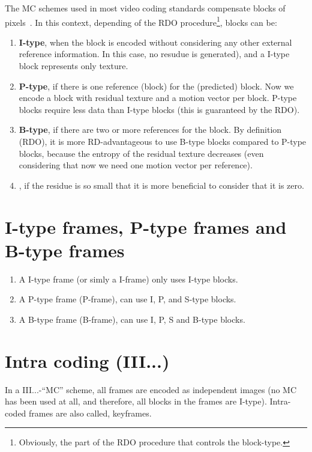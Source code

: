 The MC schemes used in most video coding standards compensate blocks
of pixels~\cite{vruiz__BBMC}. In this context, depending of the RDO
procedure\footnote{Obviously, the part of the RDO procedure that
  controls the block-type.}, blocks can be:
\begin{enumerate}
\item \textbf{I-type}, when the block is encoded without considering
  any other external reference information. In this case, no resudue
  is generated), and a I-type block represents only texture.
\item \textbf{P-type}, if there is one reference (block) for the
  (predicted) block. Now we encode a block with residual texture and a
  motion vector per block. P-type blocks require less data than I-type
  blocks (this is guaranteed by the RDO).
\item \textbf{B-type}, if there are two or more references for the
  block. By definition (RDO), it is more RD-advantageous to use B-type
  blocks compared to P-type blocks, because the entropy of the residual
  texture decreases (even considering that now we need one motion
  vector per reference).
\item {}, if the residue is so small that it is more
  beneficial to consider that it is zero.
\end{enumerate}

\section{I-type frames, P-type frames and B-type frames}

\begin{enumerate}
\item A I-type frame (or simly a I-frame) only uses I-type blocks.
\item A P-type frame (P-frame), can use I, P, and S-type blocks.
\item A B-type frame (B-frame), can use I, P, S and B-type blocks.
\end{enumerate}

\section{Intra coding (III...)}

In a III...-``MC'' scheme, all frames are encoded as independent
images (no MC has been used at all, and therefore, all blocks in the
frames are I-type). Intra-coded frames are also called, keyframes.

